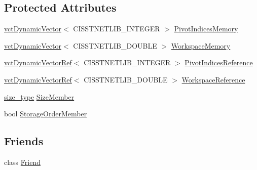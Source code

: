 \subsection*{Protected Attributes}
\begin{DoxyCompactItemize}
\item 
\hyperlink{classvct_dynamic_vector}{vct\+Dynamic\+Vector}$<$ C\+I\+S\+S\+T\+N\+E\+T\+L\+I\+B\+\_\+\+I\+N\+T\+E\+G\+E\+R $>$ \hyperlink{classnmr_inverse_dynamic_data_a011a6d0e52a20011ac77ac48ea65dc1b}{Pivot\+Indices\+Memory}
\item 
\hyperlink{classvct_dynamic_vector}{vct\+Dynamic\+Vector}$<$ C\+I\+S\+S\+T\+N\+E\+T\+L\+I\+B\+\_\+\+D\+O\+U\+B\+L\+E $>$ \hyperlink{classnmr_inverse_dynamic_data_ae76c0f077fd60cafab907d5f0e20a490}{Workspace\+Memory}
\end{DoxyCompactItemize}
{\bf }\par
\begin{DoxyCompactItemize}
\item 
\hyperlink{classvct_dynamic_vector_ref}{vct\+Dynamic\+Vector\+Ref}$<$ C\+I\+S\+S\+T\+N\+E\+T\+L\+I\+B\+\_\+\+I\+N\+T\+E\+G\+E\+R $>$ \hyperlink{classnmr_inverse_dynamic_data_ad6e68ee1c9a9705d80c5b8e69c2ec34d}{Pivot\+Indices\+Reference}
\item 
\hyperlink{classvct_dynamic_vector_ref}{vct\+Dynamic\+Vector\+Ref}$<$ C\+I\+S\+S\+T\+N\+E\+T\+L\+I\+B\+\_\+\+D\+O\+U\+B\+L\+E $>$ \hyperlink{classnmr_inverse_dynamic_data_a5233a5419f7da87a54abd486832b0817}{Workspace\+Reference}
\end{DoxyCompactItemize}

{\bf }\par
\begin{DoxyCompactItemize}
\item 
\hyperlink{classnmr_inverse_dynamic_data_aeb5c2317adf50d8fc7952a9b38bf0129}{size\+\_\+type} \hyperlink{classnmr_inverse_dynamic_data_ae4b1064f9e37250025710add092a33cf}{Size\+Member}
\item 
bool \hyperlink{classnmr_inverse_dynamic_data_a295f57a6eaeca3374aa4e58e983ccefd}{Storage\+Order\+Member}
\end{DoxyCompactItemize}

\subsection*{Friends}
\begin{DoxyCompactItemize}
\item 
class \hyperlink{classnmr_inverse_dynamic_data_a7f8321d57e81bc613d5dbef3410ba70e}{Friend}
\end{DoxyCompactItemize}


